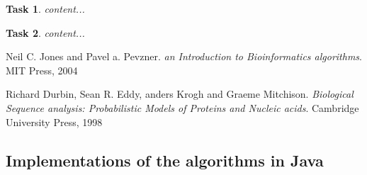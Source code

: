 \documentclass[10pt]{article} %
\theoremstyle{problemstyle}
\newtheorem{exercise}{Task}	%
\begin{document}
\begin{exercise} %
	content...
\end{exercise}

\begin{exercise} %
	content...
\end{exercise}

\begin{thebibliography}{3}
	
	Neil C. Jones and Pavel a. Pevzner. 
	\textit{an Introduction to Bioinformatics algorithms}. 
	MIT Press, 2004
	
	Richard Durbin, Sean R. Eddy, anders Krogh and Graeme Mitchison. 
	\textit{Biological Sequence analysis: Probabilistic Models of Proteins and Nucleic acids}. 
	Cambridge University Press, 1998
	
\end{thebibliography}

\newpage
\begin{appendices}
	\section{Implementations of the algorithms in Java} \label{app:alg}





\end{appendices}
\end{document}

